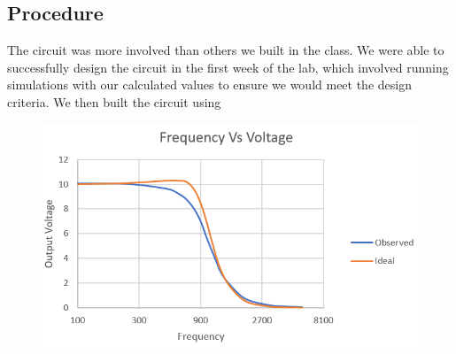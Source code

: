 \documentclass[11pt]{article}
\begin{document}
	\subsection*{Procedure}
	The circuit was more involved than others we built in the class. We were able to successfully design the circuit in the first week of the lab, which involved running simulations with our calculated values to ensure we would meet the design criteria. We then built the circuit using 
			\begin{figure}[H]
		\centering
		\includegraphics[width=5.5in]{images/comparison_graph.PNG}
	\end{figure}
\end{document}
